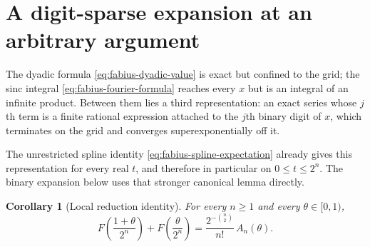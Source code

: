 \documentclass[11pt,a4paper,oneside,openany]{book}
\newtheorem{corollary}[corollary]{Corollary}
\theoremstyle{definition}
\theoremstyle{remark}
\begin{document}

\section{A digit-sparse expansion at an arbitrary argument}

The dyadic formula \eqref{eq:fabius-dyadic-value} is exact but confined to the
grid; the sinc integral \eqref{eq:fabius-fourier-formula} reaches every $x$ but
is an integral of an infinite product.  Between them lies a third
representation: an exact series whose $j$th term is a finite rational expression
attached to the $j$th binary digit of $x$, which terminates on the grid and
converges superexponentially off it.

The unrestricted spline identity \eqref{eq:fabius-spline-expectation} already
gives this representation for every real $t$, and therefore in particular on
$0\le t\le2^n$.  The binary expansion below uses that stronger canonical
lemma directly.

\begin{corollary}[Local reduction identity]\label{cor:fabius-local-reduction}
For every $n\ge1$ and every $\theta\in[0,1)$,
\begin{equation}\label{eq:fabius-local-reduction}
 F\!\left(\frac{1+\theta}{2^n}\right)+F\!\left(\frac{\theta}{2^n}\right)
 =\frac{2^{-\binom n2}}{n!}\,A_n(\theta).
\end{equation}
\end{corollary}
\end{document}
